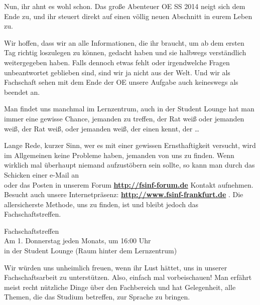 Nun, ihr ahnt es wohl schon. 
Das große Abenteuer OE SS 2014 neigt sich dem Ende zu, und ihr steuert direkt auf einen völlig neuen Abschnitt in eurem Leben zu.


Wir hoffen, dass wir an alle Informationen, die ihr braucht, um ab dem ersten Tag richtig loszulegen zu können, gedacht haben und sie halbwegs verständlich weitergegeben haben. 
Falls dennoch etwas fehlt oder irgendwelche Fragen unbeantwortet geblieben sind, sind wir ja nicht aus der Welt. 
Und wir als Fachschaft sehen mit dem Ende der OE unsere Aufgabe auch keineswegs als beendet an.


Man findet uns manchmal im Lernzentrum, auch in der Student Lounge hat man immer eine gewisse Chance, jemanden zu treffen, der Rat weiß oder jemanden weiß, der Rat weiß, oder jemanden weiß, der einen kennt, der \dots


Lange Rede, kurzer Sinn, wer es mit einer gewissen Ernsthaftigkeit versucht, wird im Allgemeinen keine Probleme haben, jemanden von uns zu finden. 
Wenn wirklich mal überhaupt niemand aufzustöbern sein sollte, so kann man durch das Schicken einer e-Mail an \emailfachschaft\\ oder das Posten in unserem Forum \textbf{\url{http://fsinf-forum.de}} Kontakt aufnehmen. 
Besucht auch unsere Internetpräsenz: \textbf{
\url{http://www.fsinf-frankfurt.de}
}.
Die allersicherste Methode, uns zu finden, ist und bleibt jedoch das Fachschaftstreffen.

\begin{center}
Fachschaftstreffen\\
Am 1. Donnerstag jeden Monats, um 16:00 Uhr\\
in der Student Lounge (Raum hinter dem Lernzentrum)\\
\end{center}


Wir würden uns unheimlich freuen, wenn ihr Lust hättet, uns in unserer Fachschaftsarbeit zu unterstützen. 
Also, einfach mal vorbeischauen! 
Man erfährt meist recht nützliche Dinge über den Fachbereich und hat Gelegenheit, alle Themen, die das Studium betreffen, zur Sprache zu bringen.
